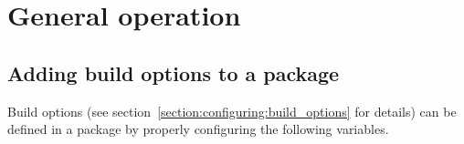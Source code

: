 %
%
%
%
%

\section{General operation} %
\label{section:genvars}

\subsection{Adding build options to a package} %
\label{section:genvars:PKG_SUPPORTED_OPTIONS}

Build options (see %
{section~\ref{section:configuring:build_options}} for details) can be defined
in a package by properly configuring the following variables.

